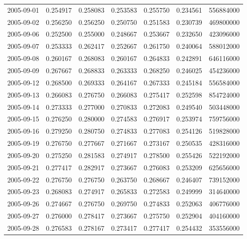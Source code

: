 \begin{tabular}{lrrrrrr}
2005-09-01 &    0.254917 &    0.258083 &    0.253583 &    0.255750 &    0.234561 &   556884000 \\
2005-09-02 &    0.256250 &    0.256250 &    0.250750 &    0.251583 &    0.230739 &   469800000 \\
2005-09-06 &    0.252500 &    0.255000 &    0.248667 &    0.253667 &    0.232650 &   423096000 \\
2005-09-07 &    0.253333 &    0.262417 &    0.252667 &    0.261750 &    0.240064 &   588012000 \\
2005-09-08 &    0.260167 &    0.268083 &    0.260167 &    0.264833 &    0.242891 &   646116000 \\
2005-09-09 &    0.267667 &    0.268833 &    0.263333 &    0.268250 &    0.246025 &   454236000 \\
2005-09-12 &    0.268500 &    0.269333 &    0.264167 &    0.267333 &    0.245184 &   556584000 \\
2005-09-13 &    0.266083 &    0.276750 &    0.266083 &    0.275417 &    0.252598 &   854724000 \\
2005-09-14 &    0.273333 &    0.277000 &    0.270833 &    0.272083 &    0.249540 &   503448000 \\
2005-09-15 &    0.276250 &    0.280000 &    0.274583 &    0.276917 &    0.253974 &   759756000 \\
2005-09-16 &    0.279250 &    0.280750 &    0.274833 &    0.277083 &    0.254126 &   519828000 \\
2005-09-19 &    0.276750 &    0.277667 &    0.271667 &    0.273167 &    0.250535 &   428316000 \\
2005-09-20 &    0.275250 &    0.281583 &    0.274917 &    0.278500 &    0.255426 &   522192000 \\
2005-09-21 &    0.277417 &    0.282917 &    0.273667 &    0.276083 &    0.253209 &   625656000 \\
2005-09-22 &    0.276750 &    0.276750 &    0.263750 &    0.268667 &    0.246407 &   739152000 \\
2005-09-23 &    0.268083 &    0.274917 &    0.265833 &    0.272583 &    0.249999 &   314640000 \\
2005-09-26 &    0.274667 &    0.276750 &    0.269750 &    0.274833 &    0.252063 &   406776000 \\
2005-09-27 &    0.276000 &    0.278417 &    0.273667 &    0.275750 &    0.252904 &   404160000 \\
2005-09-28 &    0.276583 &    0.278167 &    0.273417 &    0.277417 &    0.254432 &   353556000 \\

\end{tabular}

